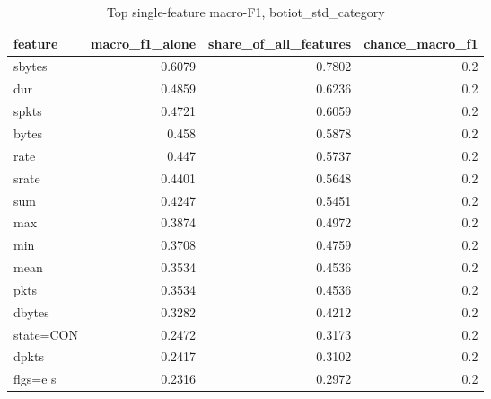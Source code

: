 \begin{table}
\caption{Top single-feature macro-F1, botiot_std_category}
\begin{tabular}{lrrr}
\toprule
feature & macro_f1_alone & share_of_all_features & chance_macro_f1 \\
\midrule
sbytes & 0.6079 & 0.7802 & 0.2 \\
dur & 0.4859 & 0.6236 & 0.2 \\
spkts & 0.4721 & 0.6059 & 0.2 \\
bytes & 0.458 & 0.5878 & 0.2 \\
rate & 0.447 & 0.5737 & 0.2 \\
srate & 0.4401 & 0.5648 & 0.2 \\
sum & 0.4247 & 0.5451 & 0.2 \\
max & 0.3874 & 0.4972 & 0.2 \\
min & 0.3708 & 0.4759 & 0.2 \\
mean & 0.3534 & 0.4536 & 0.2 \\
pkts & 0.3534 & 0.4536 & 0.2 \\
dbytes & 0.3282 & 0.4212 & 0.2 \\
state=CON & 0.2472 & 0.3173 & 0.2 \\
dpkts & 0.2417 & 0.3102 & 0.2 \\
flgs=e s & 0.2316 & 0.2972 & 0.2 \\
\bottomrule
\end{tabular}
\end{table}
